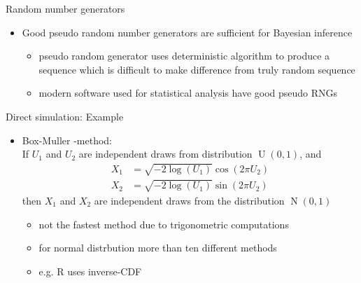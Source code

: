 \documentclass[finnish,english,t]{beamer}
\DeclareMathOperator{\N}{N}
\DeclareMathOperator{\U}{U}
\begin{document}
\begin{frame}

  {\Large\color{navyblue} Random number generators}

  \begin{itemize}
  \item Good pseudo random number generators are sufficient for
    Bayesian inference
    \begin{itemize}
    \item pseudo random generator uses deterministic algorithm to
      produce a sequence which is difficult to make difference from
      truly random sequence
    \item modern software used for statistical analysis have good
      pseudo RNGs
    \end{itemize}
  \end{itemize}

\end{frame}

\begin{frame}

  
  {\Large\color{navyblue} Direct simulation: Example}

  \begin{itemize}
  \item Box-Muller -method:\\ If $U_1$ and $U_2$ are independent
    draws from distribution $\U(0,1)$, and
    \begin{align*}
      X_1 & = \sqrt{-2\log(U_1)}\cos(2\pi U_2) \\
      X_2 & = \sqrt{-2\log(U_1)}\sin(2\pi U_2)
    \end{align*}
    then $X_1$ and $X_2$ are independent draws from the distribution
    $\N(0,1)$
    \pause
    \begin{itemize}
      \item not the fastest method due to trigonometric computations
      \item for normal distrbution more than ten different methods
      \item e.g. R uses inverse-CDF
    \end{itemize}
  \end{itemize}

\end{frame}
\end{document}

